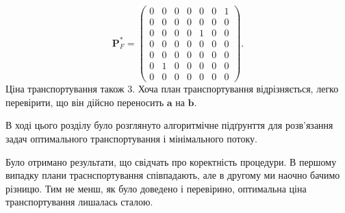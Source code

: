 $$
\mathbf{P}^*_F =
\begin{pmatrix}
    0&  0& 0& 0& 0& 0& 1\\
    0&  0& 0& 0& 0& 0& 0\\
    0&  0& 0& 0& 1& 0& 0\\
    0&  0& 0& 0& 0& 0& 0\\
    0&  0& 0& 0& 0& 0& 0\\
    0&  1& 0& 0& 0& 0& 0\\
    0&  0& 0& 0& 0& 0& 0
\end{pmatrix}.
$$
Ціна транспортування також $3$. Хоча план транспортування відрізняється, легко перевірити, що він дійсно переносить
$\mathbf{a}$ на $\mathbf{b}$.

\chapconclude{\ref{chap:experiment}}
В ході цього розділу було розглянуто алгоритмічне підґрунття для розв'язання задач оптимального транспортування і 
мінімального потоку.

Було отримано результати, що свідчать про коректність процедури. 
В першому випадку плани траснспортування співпадають, але в другому ми наочно бачимо різницю. Тим не менш, як було доведено і
перевірино, оптимальна ціна транспортування лишалась сталою.